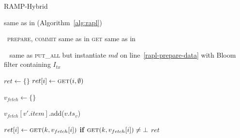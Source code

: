 \begin{algorithm}[t!]
\small
\caption{RAMP-Hybrid}
\label{alg:rapb}
\newcommand{\myindent}{\hspace{-1em}}
\begin{algorithmic}[1]
\Statex same as in \rapl (Algorithm~\ref{alg:rapl}) \vspace{.5em}

\
\Statex \textsc{prepare}, \textsc{commit} same as in \rapl
\Statex \textsc{get} same as in \raps
\Statex\hrulefill\vspace{.25em}

\vspace{.25em}

~\label{rapb-putall-start}
\Statex \hspace{1.5em} same as \rapl \textsc{put\_all} but instantiate $md$ on line~\ref{rapl-prepare-data}
\Statex \hspace{1.5em} with Bloom filter containing $I_{tx}$
\EndProcedure\vspace{.5em}\label{rapb-putall-end}

\label{rapb-client-getall-start}
  \State $ret \gets \{\}$\label{rapb-client-firstround-start}
  \State $ret[i] \gets \textsc{get}(i, \emptyset)$\label{rapb-client-firstround-get}
  \EndParFor\vspace{.25em}\label{rapb-client-firstround-end}

  \State $v_{fetch} \gets \{\}$

  \label{rapb-client-compute-start}
    \State $v_{fetch}[v'.item]$.add($v.ts_v$)\label{rapb-client-compute-step}
  \EndIf
  \EndFor
  \EndFor\label{rapb-client-compute-end}

  \label{rapb-client-secondround-start}
        \State $ret[i] \gets \textsc{get}(k, v_{fetch}[i])$ \textbf{if}
        $\textsc{get}(k, v_{fetch}[i]) \neq \bot$ \label{rapb-client-secondround-get}
  \EndParFor\vspace{.25em}\label{rapb-client-secondround-start}
  \State \Return $ret$\label{rapb-client-getall-return}
\EndProcedure\label{rapb-client-getall-end}


\end{algorithmic}
\end{algorithm}


